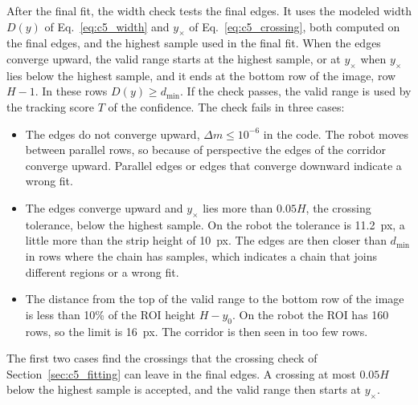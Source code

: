After the final fit, the width check tests the final edges. It uses the modeled width $D(y)$ of Eq.~\eqref{eq:c5_width} and $y_\times$ of Eq.~\eqref{eq:c5_crossing}, both computed on the final edges, and the highest sample used in the final fit. When the edges converge upward, the valid range starts at the highest sample, or at $y_\times$ when $y_\times$ lies below the highest sample, and it ends at the bottom row of the image, row $H-1$. In these rows $D(y)\geq d_{\min}$. If the check passes, the valid range is used by the tracking score $T$ of the confidence. The check fails in three cases:
\begin{itemize}
    \item The edges do not converge upward, $\Delta m\leq10^{-6}$ in the code. The robot moves between parallel rows, so because of perspective the edges of the corridor converge upward. Parallel edges or edges that converge downward indicate a wrong fit.
    \item The edges converge upward and $y_\times$ lies more than $0.05H$, the crossing tolerance, below the highest sample. On the robot the tolerance is 11.2~px, a little more than the strip height of 10~px. The edges are then closer than $d_{\min}$ in rows where the chain has samples, which indicates a chain that joins different regions or a wrong fit.
    \item The distance from the top of the valid range to the bottom row of the image is less than 10\% of the ROI height $H-y_0$. On the robot the ROI has 160 rows, so the limit is 16~px. The corridor is then seen in too few rows.
\end{itemize}
The first two cases find the crossings that the crossing check of Section~\ref{sec:c5_fitting} can leave in the final edges. A crossing at most $0.05H$ below the highest sample is accepted, and the valid range then starts at $y_\times$.

